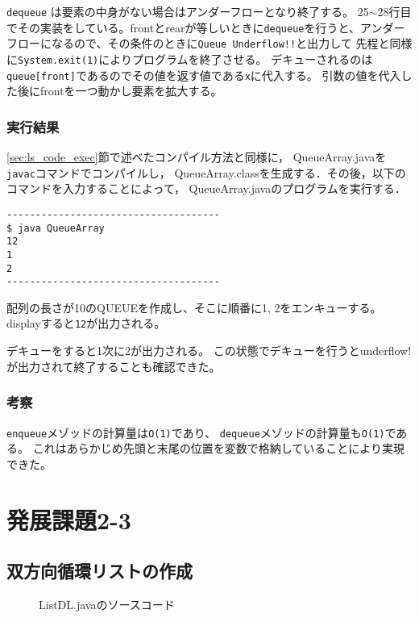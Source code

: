 \documentclass[10.5pt,a4paper]{jsarticle}
\newcommand{\secref}[1]{\ref{#1}節}
\begin{document}
\texttt{dequeue}
は要素の中身がない場合はアンダーフローとなり終了する。
25$\sim$28行目でその実装をしている。frontとrearが等しいときに\texttt{dequeue}を行うと、アンダーフローになるので、その条件のときに\texttt{Queue Underflow!!}と出力して
先程と同様に\texttt{System.exit(1)}によりプログラムを終了させる。
デキューされるのは\texttt{queue[front]}であるのでその値を返す値である\texttt{x}に代入する。
引数の値を代入した後にfrontを一つ動かし要素を拡大する。

\subsubsection{実行結果}

\secref{sec:ls_code_exec}で述べたコンパイル方法と同様に，
QueueArray.javaを\texttt{javac}コマンドでコンパイルし，
QueueArray.classを生成する．その後，以下のコマンドを入力することによって，
QueueArray.javaのプログラムを実行する．

\begin{verbatim}
-------------------------------------
$ java QueueArray
12
1
2
-------------------------------------
\end{verbatim}

配列の長さが10のQUEUEを作成し、そこに順番に1, 2をエンキューする。
displayすると\texttt{12}が出力される。

デキューをすると1次に2が出力される。
この状態でデキューを行うとunderflow!が出力されて終了することも確認できた。

\subsubsection{考察}
\texttt{enqueue}メゾッドの計算量は\texttt{O(1)}であり、
\texttt{dequeue}メゾッドの計算量も\texttt{O(1)}である。
これはあらかじめ先頭と末尾の位置を変数で格納していることにより実現できた。

\section{発展課題2-3}

\subsection{双方向循環リストの作成}

\begin{figure}[t]
  \begin{center}
   
   \caption{ListDL.javaのソースコード}
   \label{code:ListDL}
  \end{center}
\end{figure}
\end{document}
